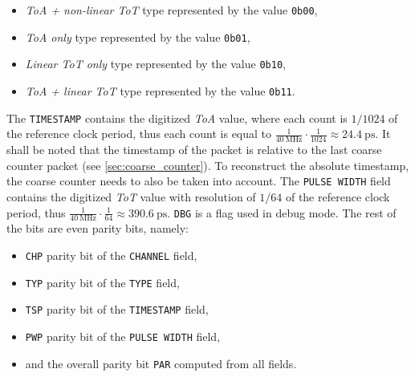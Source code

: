 \begin{itemize}
    \item \emph{ToA + non-linear ToT} type represented by the value \verb|0b00|,
    \item \emph{ToA only} type represented by the value \verb|0b01|,
    \item \emph{Linear ToT only} type represented by the value \verb|0b10|,
    \item \emph{ToA + linear ToT} type represented by the value \verb|0b11|.
\end{itemize}
%
The \verb|TIMESTAMP| contains the digitized \emph{ToA} value, where each count is $1/1024$ of the reference clock period, thus each count is equal to $\frac{1}{\SI{40}{\mega\hertz}} \cdot \frac{1}{1024} \approx \SI{24.4}{\pico\second} $. It shall be noted that the timestamp of the packet is relative to the last coarse counter packet (see \ref{sec:coarse_counter}). To reconstruct the absolute timestamp, the coarse counter needs to also be taken into account. The \verb|PULSE WIDTH| field contains the digitized \emph{ToT} value with resolution of $1/64$ of the reference clock period, thus $\frac{1}{\SI{40}{\mega\hertz}} \cdot \frac{1}{64} \approx \SI{390.6}{\pico\second}$. \verb|DBG| is a flag used in debug mode. The rest of the bits are even parity bits, namely:
\begin{itemize}
    \item \verb|CHP| parity bit of the \verb|CHANNEL| field,
    \item \verb|TYP| parity bit of the \verb|TYPE| field,
    \item \verb|TSP| parity bit of the \verb|TIMESTAMP| field,
    \item \verb|PWP| parity bit of the \verb|PULSE WIDTH| field,
    \item and the overall parity bit \verb|PAR| computed from all fields.
\end{itemize}

